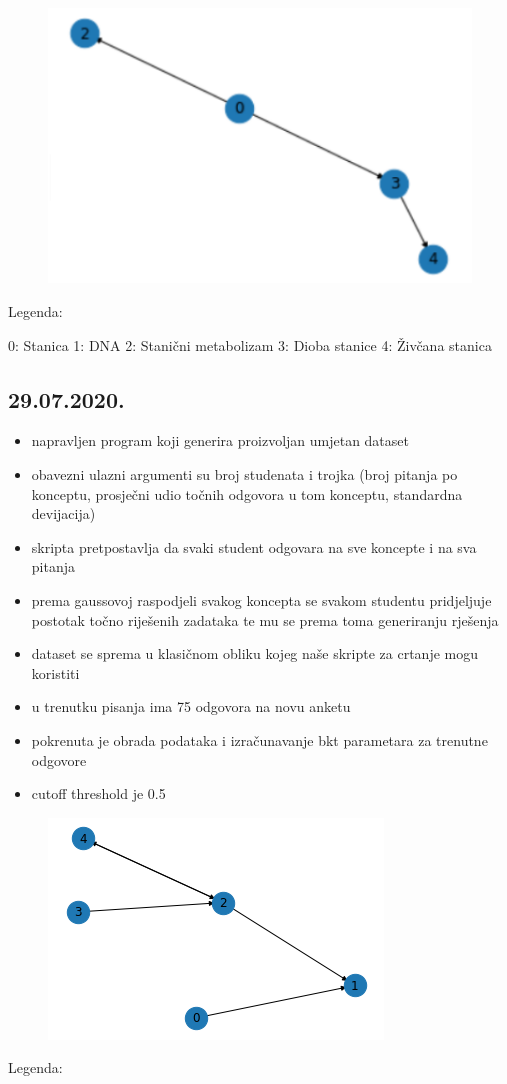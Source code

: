 \documentclass[times, utf8,projekt]{fer}
\begin{document}
		\begin{figure}[!htb]
		\centering
		\includegraphics[scale=1]{Bayes_graf3.png}
		\caption{}
		\label{}
		\end{figure}
		Legenda:
		
		0: Stanica
		1: DNA
		2: Stanični metabolizam
		3: Dioba stanice
		4: Živčana stanica

		\subsection{29.07.2020.}
		\begin{itemize}
			\item napravljen program koji generira proizvoljan umjetan dataset
			\item obavezni ulazni argumenti su broj studenata i trojka (broj pitanja po konceptu, prosječni udio točnih odgovora u tom konceptu, standardna devijacija)
			\item skripta pretpostavlja da svaki student odgovara na sve koncepte i na sva pitanja
			\item prema gaussovoj raspodjeli svakog koncepta se svakom studentu pridjeljuje postotak točno riješenih zadataka te mu se prema toma generiranju rješenja
			\item dataset se sprema u klasičnom obliku kojeg naše skripte za crtanje mogu koristiti
			\item u trenutku pisanja ima 75 odgovora na novu anketu
			\item pokrenuta je obrada podataka i izračunavanje bkt parametara za trenutne odgovore
			\item cutoff threshold je 0.5
		\end{itemize}
		\begin{figure}[!htb]
			\centering
			\includegraphics[scale=1]{Bayes_graf4.png}
			\caption{}
			\label{}
		\end{figure}
		Legenda:
		
\end{document}
